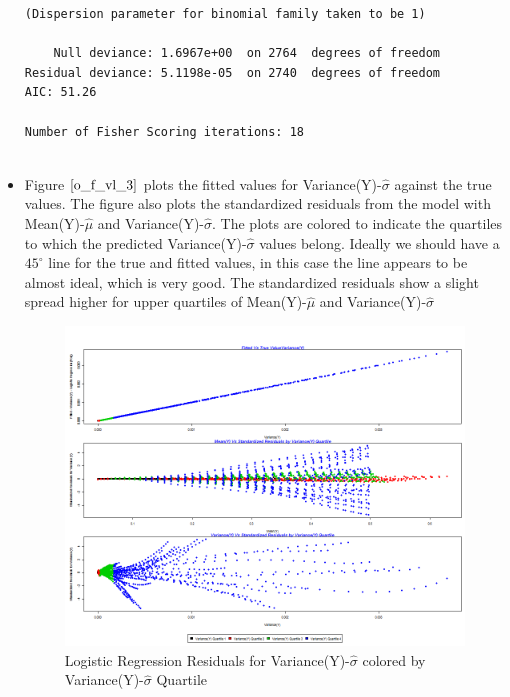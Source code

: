 \documentclass[twoside,12pt]{article}
\begin{document}
\begin{itemize}
\begin{verbatim}
(Dispersion parameter for binomial family taken to be 1)

    Null deviance: 1.6967e+00  on 2764  degrees of freedom
Residual deviance: 5.1198e-05  on 2740  degrees of freedom
AIC: 51.26

Number of Fisher Scoring iterations: 18


\end{verbatim}

\FloatBarrier
\item
Figure $\eqref{o_f_vl_3}$ plots the fitted values for Variance(Y)-$\hat{\sigma}$ against the true values. The figure also plots the standardized residuals from the model with Mean(Y)-$\hat{\mu}$ and Variance(Y)-$\hat{\sigma}$. The plots are colored to indicate the quartiles to which the predicted Variance(Y)-$\hat{\sigma}$ values belong. Ideally we should have a $45^{\circ}$ line for the true and fitted values, in this case the line appears to be almost ideal, which is very good. The standardized residuals show a slight spread higher for upper quartiles of Mean(Y)-$\hat{\mu}$ and  Variance(Y)-$\hat{\sigma}$
\FloatBarrier
\begin{figure}[!htbp]
\centering
\includegraphics[scale=.50]{images/mt_rse_plot_v_trg_lr_poly.png} 
\caption{Logistic Regression Residuals for Variance(Y)-$\hat{\sigma}$ colored by Variance(Y)-$\hat{\sigma}$ Quartile}
\label{o_f_vl_3}
\end{figure}


\end{itemize}
\end{document}
